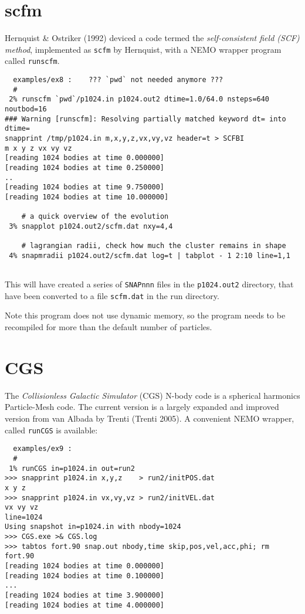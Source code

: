 \begin{itemize}
\begin{itemize}
\section{scfm}

Hernquist \& Ostriker (1992) deviced a code termed the 
{\it self-consistent field (SCF) method}, implemented as {\tt scfm} by
Hernquist, with a NEMO wrapper program called {\tt runscfm}.

\footnotesize\begin{verbatim}
  examples/ex8 :    ??? `pwd` not needed anymore ???
  #
 2% runscfm `pwd`/p1024.in p1024.out2 dtime=1.0/64.0 nsteps=640 noutbod=16
### Warning [runscfm]: Resolving partially matched keyword dt= into dtime=
snapprint /tmp/p1024.in m,x,y,z,vx,vy,vz header=t > SCFBI
m x y z vx vy vz
[reading 1024 bodies at time 0.000000]
[reading 1024 bodies at time 0.250000]
..
[reading 1024 bodies at time 9.750000]
[reading 1024 bodies at time 10.000000]

    # a quick overview of the evolution 
 3% snapplot p1024.out2/scfm.dat nxy=4,4

    # lagrangian radii, check how much the cluster remains in shape
 4% snapmradii p1024.out2/scfm.dat log=t | tabplot - 1 2:10 line=1,1
 

\end{verbatim}\normalsize

This will have created a series of {\tt SNAPnnn} files in the {\tt p1024.out2}
directory, that have been converted to a file {\tt scfm.dat} in the 
run directory.

Note this program does not use dynamic memory, so the program needs to 
be recompiled for more than the default number of particles.

\section{CGS}

The {\it Collisionless Galactic Simulator} (CGS) N-body code is a spherical
harmonics Particle-Mesh code. The current version is a largely expanded and
improved version from van Albada by Trenti (Trenti 2005). A convenient
NEMO wrapper, called {\tt runCGS} is available:

\footnotesize\begin{verbatim}
  examples/ex9 :  
  #
 1% runCGS in=p1024.in out=run2 
>>> snapprint p1024.in x,y,z    > run2/initPOS.dat
x y z
>>> snapprint p1024.in vx,vy,vz > run2/initVEL.dat
vx vy vz
line=1024
Using snapshot in=p1024.in with nbody=1024
>>> CGS.exe >& CGS.log
>>> tabtos fort.90 snap.out nbody,time skip,pos,vel,acc,phi; rm fort.90
[reading 1024 bodies at time 0.000000]
[reading 1024 bodies at time 0.100000]
...
[reading 1024 bodies at time 3.900000]
[reading 1024 bodies at time 4.000000]


\end{verbatim}
\end{itemize}
\end{itemize}
